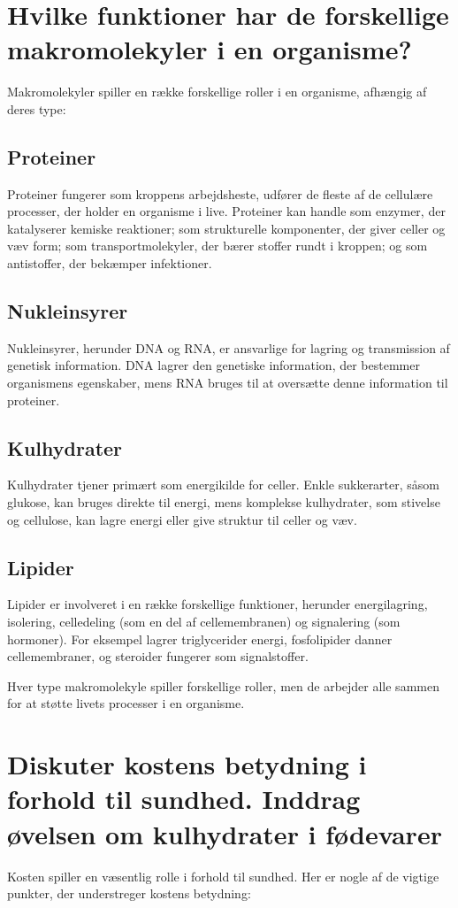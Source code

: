 \section{Hvilke funktioner har de forskellige makromolekyler i en organisme?}
Makromolekyler spiller en række forskellige roller i en organisme, afhængig af deres type:
    \subsection*{Proteiner}
        Proteiner fungerer som kroppens arbejdsheste, udfører de fleste af de cellulære processer, der holder en organisme i live. Proteiner kan handle som enzymer, der katalyserer kemiske reaktioner; som strukturelle komponenter, der giver celler og væv form; som transportmolekyler, der bærer stoffer rundt i kroppen; og som antistoffer, der bekæmper infektioner.

    \subsection*{Nukleinsyrer}
        Nukleinsyrer, herunder DNA og RNA, er ansvarlige for lagring og transmission af genetisk information. DNA lagrer den genetiske information, der bestemmer organismens egenskaber, mens RNA bruges til at oversætte denne information til proteiner.
    
    \subsection*{Kulhydrater}
        Kulhydrater tjener primært som energikilde for celler. Enkle sukkerarter, såsom glukose, kan bruges direkte til energi, mens komplekse kulhydrater, som stivelse og cellulose, kan lagre energi eller give struktur til celler og væv.
    \subsection*{Lipider}
        Lipider er involveret i en række forskellige funktioner, herunder energilagring, isolering, celledeling (som en del af cellemembranen) og signalering (som hormoner). For eksempel lagrer triglycerider energi, fosfolipider danner cellemembraner, og steroider fungerer som signalstoffer.

    Hver type makromolekyle spiller forskellige roller, men de arbejder alle sammen for at støtte livets processer i en organisme.
\section{Diskuter kostens betydning i forhold til sundhed. Inddrag øvelsen om kulhydrater i fødevarer}
    Kosten spiller en væsentlig rolle i forhold til sundhed. Her er nogle af de vigtige punkter, der understreger kostens betydning:

